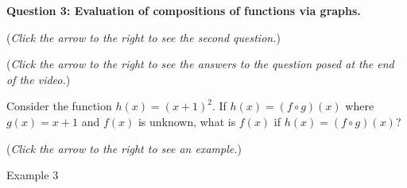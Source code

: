 \documentclass{ximera}
\begin{document}
\textbf{Question 3: Evaluation of compositions
of functions via graphs.}
\begin{question}
\begin{flushright}
{\color{blue}(\emph{Click the arrow to the right to see the second question.})}
\end{flushright}
\begin{center}
\begin{expandable}
{\color{blue}(\emph{Click the arrow to the right to see the answers 
to the question posed at the end of the video.})}
\begin{expandable}
Consider the function $h(x) = (x + 1)^2$. If $h(x) = (f\circ g)(x)$ where $g(x) = x+1$ and $f(x)$ is unknown, what is $f(x)$ if $h(x) = (f \circ g)(x)$?
\begin{multipleChoice}
\end{multipleChoice}
\begin{flushright}
{\color{blue}(\emph{Click the arrow to the right to see an example.})}
\end{flushright}
\begin{expandable}
Example 3
\end{expandable}
\end{expandable}
\end{expandable}
\end{center}
\end{question}
\end{document}
